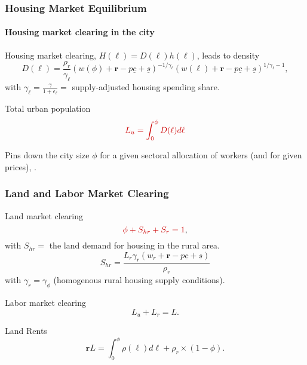 \documentclass[aspectratio=169]{beamer}
\begin{document}
\begin{v75mins}

\begin{frame}
\frametitle{Housing Market Equilibrium}
\framesubtitle{Housing market clearing in the city}
\bi
\item Housing market clearing, $H(\ell)=D(\ell)h(\ell)$, leads to density
\begin{equation*}
D(\ell)= \frac{\rho_r}{\gamma_{\ell}}(w(\phi)+\mathbf{r}-p\underline{c}+\underline{s}) ^{-1/\gamma_{\ell} } (w(\ell)+\mathbf{r}-p\underline{c}+\underline{s})^{1/\gamma_{\ell} -1},
\end{equation*}
with $\gamma_{\ell}=\frac{\gamma}{1+\epsilon_{\ell}}=$ supply-adjusted housing spending share.
\item Total urban population
\begin{equation}
\re{L_u=\int_0^{\phi}D(\ell)d\ell}  \label{eq:citysize}
\end{equation}
\item Pins down the city size $\phi$ for a given sectoral allocation of workers (and for given prices), .
\ei
\end{frame}

\begin{frame}
\frametitle{Land and Labor Market Clearing}
\bi
\item Land market clearing
 \begin{equation*}
 \re{\phi+S_{hr}+S_r =1},
 \end{equation*}
with $S_{hr}=$ the land demand for housing in the rural area.
\begin{equation*}
S_{hr}=\frac{L_r \gamma_r \left( w_r+\mathbf{r}-p\underline{c} +\underline{s}\right)}{ \rho_r}
 \end{equation*}
with $\gamma_r=\gamma_\phi$ (homogenous rural housing supply conditions).
 \item Labor market clearing
  \begin{equation*}
 L_u+L_r=L.
 \end{equation*}
 \item Land Rents
  \begin{equation}
 \mathbf{r} L=\int_{0}^{\phi}\rho(\ell)d\ell+\rho_r \times (1-\phi). \label{eq:landrents}
 \end{equation}
 \ei
\end{frame}



\end{v75mins}
\end{document}

